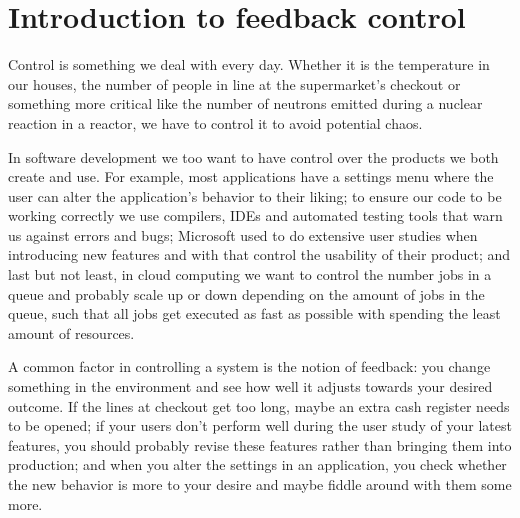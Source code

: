 \chapter{Introduction to feedback control}


Control is something we deal with every day. Whether it is the temperature in our houses, the number of people in line at the supermarket's checkout or something more critical like the number of neutrons emitted during a nuclear reaction in a reactor, we have to control it to avoid potential chaos.

In software development we too want to have control over the products we both create and use. For example, most applications have a settings menu where the user can alter the application's behavior to their liking; to ensure our code to be working correctly we use compilers, IDEs and automated testing tools that warn us against errors and bugs; Microsoft used to do extensive user studies when introducing new features \cite{meijer2014-embracing-the-hacker-way} and with that control the usability of their product; and last but not least, in cloud computing we want to control the number jobs in a queue and probably scale up or down depending on the amount of jobs in the queue, such that all jobs get executed as fast as possible with spending the least amount of resources.

A common factor in controlling a system is the notion of feedback: you change something in the environment and see how well it adjusts towards your desired outcome. If the lines at checkout get too long, maybe an extra cash register needs to be opened; if your users don't perform well during the user study of your latest features, you should probably revise these features rather than bringing them into production; and when you alter the settings in an application, you check whether the new behavior is more to your desire and maybe fiddle around with them some more.

